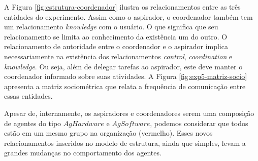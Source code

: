 \begin{figure}[h!]
    \centering
\end{figure}

A Figura \ref{fig:estrutura-coordenador} ilustra os relacionamentos entre as três entidades do experimento. Assim como o aspirador, o coordenador também tem um relacionamento \textit{knowledge} com o usuário. O que significa que seu relacionamento se limita ao conhecimento da existência um do outro. O relacionamento de autoridade entre o coordenador e o aspirador implica necessariamente na existência dos relacionamentos \textit{control}, \textit{coordination} e \textit{knowledge}.  Ou seja, além de delegar tarefas ao aspirador, este deve manter o coordenador informado sobre suas atividades.  A Figura \ref{fig:exp5-matriz-socio} apresenta a matriz sociométrica que relata a frequência de comunicação entre essas entidades. 

\begin{figure}[h!]
    \centering
\end{figure}

Apesar de, internamente, os aspiradores e coordenadores serem uma composição de agentes do tipo $AgHardware$ e $AgSoftware$, podemos considerar que todos estão em um mesmo grupo na organização (vermelho). Esses novos relacionamentos inseridos no modelo de estrutura, ainda que simples, levam a grandes mudanças no comportamento dos agentes.  

